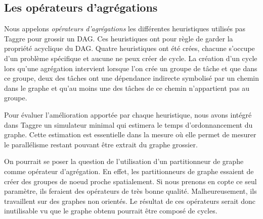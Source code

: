 \subsection{Les opérateurs d'agrégations}
Nous appelons {\em opérateurs d'agrégations} les différentes heuristiques utilisés pas Taggre pour grossir un DAG.
%
Ces heuristiques ont pour règle de garder la propriété acyclique du DAG.
%
Quatre heuristiques ont été crées, chacune s'occupe d'un problème spécifique et aucune ne peux créer de cycle.
%
La création d'un cycle lors qu'une agrégation intervient lorsque l'on crée un groupe de tâche et que dans ce groupe, deux des tâches ont une dépendance indirecte symbolisé par un chemin dans le graphe et qu'au moins une des tâches de ce chemin n'appartient pas au groupe.


Pour évaluer l'amélioration apportée par chaque heuristique, nous avons intégré dans Taggre un simulateur minimal qui estimera le temps d'ordonnancement du graphe.
%
Cette estimation est essentielle dans la mesure où elle permet de mesurer le parallélisme restant pouvant être extrait du graphe grossier.

On pourrait se poser la question de l'utilisation d'un partitionneur de graphe comme opérateur d'agrégation.
%
En effet, les partitionneurs de graphe essaient de créer des groupes de noeud proche spatialement.
%
Si nous prenons en copte ce seul paramètre, ils feraient des opérateurs de très bonne qualité.
%
Malheureusement, ils travaillent sur des graphes non orientés.
%
Le résultat de ces opérateurs serait donc inutilisable vu que le graphe obtenu pourrait être composé de cycles.
